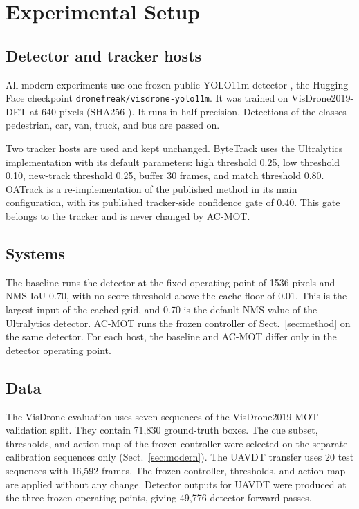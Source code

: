 \section{Experimental Setup}\label{sec:setup}

\subsection{Detector and tracker hosts}
All modern experiments use one frozen public YOLO11m detector
\cite{jocher2024yolo11}, the
Hugging Face checkpoint \texttt{dronefreak/\allowbreak visdrone-\allowbreak yolo11m}. It was
trained on VisDrone2019-DET at 640 pixels (SHA256 \checkpointsha). It runs in half precision. Detections of the
classes pedestrian, car, van, truck, and bus are passed on.

Two tracker hosts are used and kept unchanged. ByteTrack uses the Ultralytics
implementation with its default parameters: high threshold 0.25, low
threshold 0.10, new-track threshold 0.25, buffer 30 frames, and match
threshold 0.80. OATrack is a
re-implementation of the published method \cite{qi2026oatrack} in its main
configuration, with its published tracker-side confidence gate of 0.40. This gate belongs
to the tracker and is never changed by AC-MOT.

\subsection{Systems}
The baseline runs the detector at the fixed operating point of 1536 pixels and
NMS IoU 0.70, with no score threshold above the cache floor of 0.01. This is
the largest input of the cached grid, and 0.70 is the default NMS value of the
Ultralytics detector. AC-MOT
runs the frozen controller of Sect.~\ref{sec:method} on the same detector. For
each host, the baseline and AC-MOT differ only in the detector operating
point.

\subsection{Data}
The VisDrone evaluation uses seven sequences of the VisDrone2019-MOT
validation split. They contain 71,830 ground-truth boxes. The cue subset,
thresholds, and action map of the frozen controller were selected on the
separate calibration sequences only (Sect.~\ref{sec:modern}). The UAVDT transfer uses 20 test
sequences with 16,592 frames. The frozen controller, thresholds, and action
map are applied without any change. Detector outputs for UAVDT were produced
at the three frozen operating points, giving 49,776 detector forward passes.

